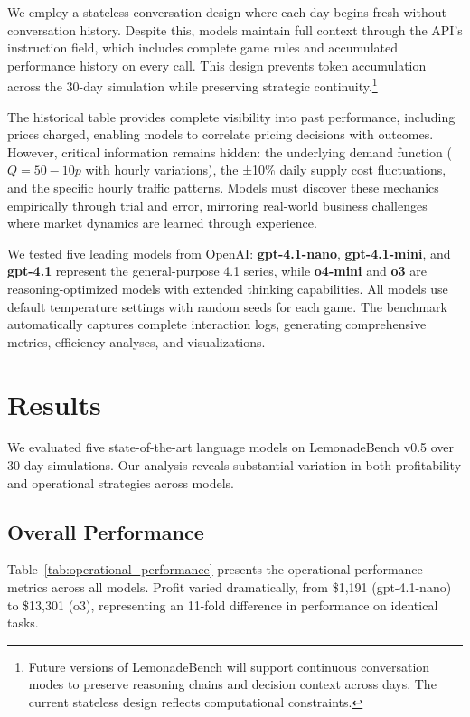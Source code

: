 \documentclass[11pt]{article}
\begin{document}
We employ a stateless conversation design where each day begins fresh without conversation history.
Despite this, models maintain full context through the API's instruction field, which includes complete game rules and accumulated performance history on every call.
This design prevents token accumulation across the 30-day simulation while preserving strategic continuity.\footnote{Future versions of LemonadeBench will support continuous conversation modes to preserve reasoning chains and decision context across days. The current stateless design reflects computational constraints.}

The historical table provides complete visibility into past performance, including prices charged, enabling models to correlate pricing decisions with outcomes.
However, critical information remains hidden: the underlying demand function ($Q = 50 - 10p$ with hourly variations), the ±10\% daily supply cost fluctuations, and the specific hourly traffic patterns.
Models must discover these mechanics empirically through trial and error, mirroring real-world business challenges where market dynamics are learned through experience.

We tested five leading models from OpenAI: \textbf{gpt-4.1-nano}, \textbf{gpt-4.1-mini}, and \textbf{gpt-4.1} represent the general-purpose 4.1 series, while \textbf{o4-mini} and \textbf{o3} are reasoning-optimized models with extended thinking capabilities.
All models use default temperature settings with random seeds for each game.
The benchmark automatically captures complete interaction logs, generating comprehensive metrics, efficiency analyses, and visualizations.

\section{Results}
\label{sec:results}

We evaluated five state-of-the-art language models on LemonadeBench v0.5 over 30-day simulations. Our analysis reveals substantial variation in both profitability and operational strategies across models.

\subsection{Overall Performance}

Table~\ref{tab:operational_performance} presents the operational performance metrics across all models. Profit varied dramatically, from \$1,191 (gpt-4.1-nano) to \$13,301 (o3), representing an 11-fold difference in performance on identical tasks.
\end{document}
